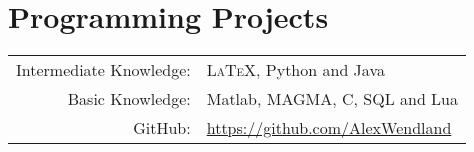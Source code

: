 \documentclass[a4paper,10pt]{article}
\begin{document}

\section{Programming Projects}
\begin{tabular}{rl}
	Intermediate Knowledge:&  \textsc{LaTeX}, Python and Java\\
	Basic Knowledge:& Matlab, \textsc{MAGMA}, C, SQL and Lua\\
	GitHub:& \href{https://github.com/AlexWendland}{https://github.com/AlexWendland}
\end{tabular}\\
\vspace{0.1 in}\\
\end{document}
